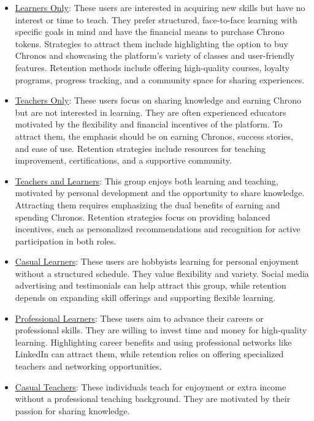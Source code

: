 \begin{itemize}
    \item \underline{Learners Only}: These users are interested in acquiring new skills but have no interest or time to teach.
    They prefer structured, face-to-face learning with specific goals in mind and have the financial means to purchase Chrono tokens.
    Strategies to attract them include highlighting the option to buy Chronos and showcasing the platform’s variety of classes and user-friendly features.
    Retention methods include offering high-quality courses, loyalty programs, progress tracking, and a community space for sharing experiences.
    \item \underline{Teachers Only}: These users focus on sharing knowledge and earning Chrono but are not interested in learning.
    They are often experienced educators motivated by the flexibility and financial incentives of the platform.
    To attract them, the emphasis should be on earning Chronos, success stories, and ease of use.
    Retention strategies include resources for teaching improvement, certifications, and a supportive community.
    \item \underline{Teachers and Learners}: This group enjoys both learning and teaching, motivated by personal development and the opportunity to share knowledge.
    Attracting them requires emphasizing the dual benefits of earning and spending Chronos.
    Retention strategies focus on providing balanced incentives, such as personalized recommendations and recognition for active participation in both roles.
    \item \underline{Casual Learners}: These users are hobbyists learning for personal enjoyment without a structured schedule.
    They value flexibility and variety.
    Social media advertising and testimonials can help attract this group, while retention depends on expanding skill offerings and supporting flexible learning.
    \item \underline{Professional Learners}: These users aim to advance their careers or professional skills.
    They are willing to invest time and money for high-quality learning.
    Highlighting career benefits and using professional networks like LinkedIn can attract them, while retention relies on offering specialized teachers and networking opportunities.
    \item \underline{Casual Teachers}: These individuals teach for enjoyment or extra income without a professional teaching background.
    They are motivated by their passion for sharing knowledge.

\end{itemize}
